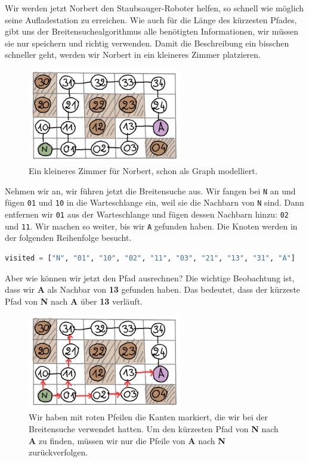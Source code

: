 Wir werden jetzt Norbert den Staubsauger-Roboter helfen, so schnell wie möglich seine Aufladestation zu erreichen. Wie auch für die Länge des kürzesten Pfades, gibt uns der Breitensuchealgorithmus alle benötigten Informationen, wir müssen sie nur speichern und richtig verwenden. Damit die Beschreibung ein bisschen schneller geht, werden wir Norbert in ein kleineres Zimmer platzieren.
\begin{figure}[H]
    \centering
    \includegraphics[width=0.6\textwidth]{Pictures/SP/norbert_klein_graph.png}
    \caption{Ein kleineres Zimmer für Norbert, schon als Graph modelliert.}
    \label{fig:norbert_klein_graph}
\end{figure}
Nehmen wir an, wir führen jetzt die Breitensuche aus. Wir fangen bei \texttt{N} an und fügen \texttt{01} und \texttt{10} in die Warteschlange ein, weil sie die Nachbarn von \texttt{N} sind. Dann entfernen wir \texttt{01} aus der Warteschlange und fügen dessen Nachbarn hinzu: \texttt{02} und \texttt{11}. Wir machen so weiter, bis wir \texttt{A} gefunden haben.  Die Knoten werden in der folgenden Reihenfolge besucht.
\begin{lstlisting}[language=Python]
visited = ["N", "01", "10", "02", "11", "03", "21", "13", "31", "A"]
\end{lstlisting}
Aber wie können wir jetzt den Pfad ausrechnen?
Die wichtige Beobachtung ist, dass wir \textbf{A} als Nachbar von \textbf{13} gefunden haben. Das bedeutet, dass der kürzeste Pfad von \textbf{N} nach \textbf{A} über \textbf{13} verläuft.
\begin{figure}[H]
    \centering
    \includegraphics[width=0.6\textwidth]{Pictures/SP/norbert_klein_graph_arrows.png}
    \caption{Wir haben mit roten Pfeilen die Kanten markiert, die wir bei der Breitensuche verwendet hatten. Um den kürzesten Pfad von \textbf{N} nach \textbf{A} zu finden, müssen wir nur die Pfeile von \textbf{A} nach \textbf{N} zurückverfolgen.}
    \label{fig:norbert_klein_graph_arrows}
\end{figure}
